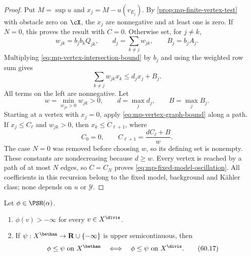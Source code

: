 \begin{proof}
Put $M=\sup u$ and $x_j=M-u(v_{E_j})$. By \cref{prop:mp-finite-vertex-test} with obstacle zero on $\cX$, the $x_j$ are nonnegative and at least one is zero. If $N=0$, this proves the result with $C=0$. Otherwise set, for $j\ne k$,
\[
 w_{jk}=b_jb_kQ_{jk},\qquad
 d_j=\sum_{k\ne j}w_{jk},\qquad B_j=b_jA_j.
\]
Multiplying \eqref{eq:mp-vertex-intersection-bound} by $b_j$ and using the weighted row sum gives
\[
                 \sum_{k\ne j}w_{jk}x_k\leq d_jx_j+B_j.
\tag{60.16e}\label{eq:mp-vertex-graph-bound}
\]
All terms on the left are nonnegative. Let
\[
 w=\min_{w_{jk}>0}w_{jk}>0,\qquad
 d=\max_j d_j,\qquad B=\max_j B_j.
\]
Starting at a vertex with $x_j=0$, apply \eqref{eq:mp-vertex-graph-bound} along a path. If $x_j\leq C_\ell$ and $w_{jk}>0$, then $x_k\leq C_{\ell+1}$, where
\[
              C_0=0,\qquad C_{\ell+1}=\frac{dC_\ell+B}{w}.
\]
The case $N=0$ was removed before choosing $w$, so its defining set is nonempty. These constants are nondecreasing because $d\geq w$. Every vertex is reached by a path of at most $N$ edges, so $C=C_N$ proves \eqref{eq:mp-fixed-model-oscillation}. All coefficients in this recursion belong to the fixed model, background and K\"ahler class; none depends on $u$ or $\mathcal Y$.
\end{proof}

\begin{samepage}
\begin{theorem}\label{thm:mp-psh-divisorial}
Let $\phi\in\PSH(\alpha)$.
\begin{enumerate}
\item $\phi(v)>-\infty$ for every $v\in X^{\divis}$.
\item If $\psi:X^{\bethan}\to\mathbf R\cup\{-\infty\}$ is upper semicontinuous, then
      \[
        \phi\leq\psi\text{ on }X^{\bethan}
        \quad\Longleftrightarrow\quad
        \phi\leq\psi\text{ on }X^{\divis}.
      \tag{60.17}\label{eq:mp-divisorial-comparison}
      \]
\end{enumerate}
\par
\end{theorem}
\end{samepage}

